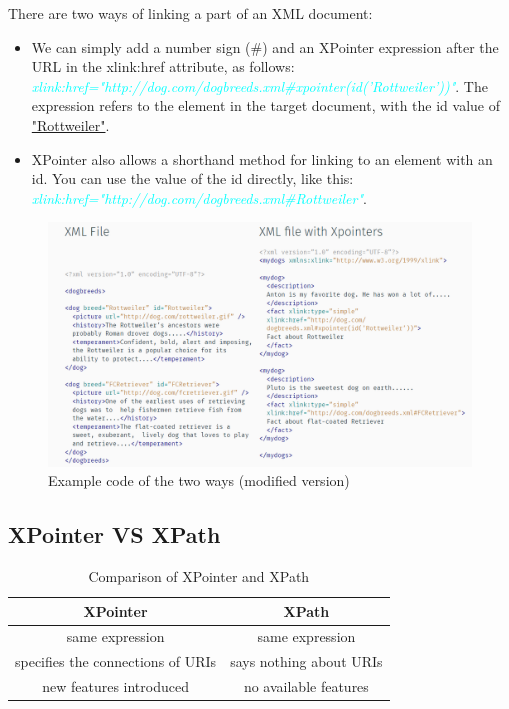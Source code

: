 \documentclass[11pt]{article}
\begin{document}
There are two ways of linking a part of an XML document:
\begin{itemize}
\item We can simply add a number sign (\#) and an XPointer expression after the URL in the xlink:href attribute, as follows:
\textcolor{cyan}{\textit{xlink:href="http://dog.com/dogbreeds.xml\#xpointer(id('Rottweiler'))"}}. The expression refers to the element in the target document, with the id value of \underline{"Rottweiler"}.
\item XPointer also allows a shorthand method for linking to an element with an id. You can use the value of the id directly, like this: \textcolor{cyan}{\textit{xlink:href="http://dog.com/dogbreeds.xml\#Rottweiler"}}.
\end{itemize}
\begin{figure}[!htb]
\centering
  \includegraphics[width=.9\linewidth]{images/xpointerExample}
  \caption{Example code of the two ways (modified version) \cite{W3CSchools}}
  \label{fig:xpointerExample}
\end{figure}
\FloatBarrier

\subsection{XPointer VS XPath}

\begin{table}[!htb]
\centering
 \begin{tabular}{||c || c||} 
 \hline
 \textbf{XPointer} & \textbf{XPath}\\ [0.5ex] 
 \hline
 same expression & same expression\\ 
 \hline
 specifies the connections of URIs & says nothing about URIs \\
 \hline
 new features introduced & no available features \\
 \hline
\end{tabular}
\caption{Comparison of XPointer and XPath}
\label{table:xpointerVSxpath}
\end{table}
\FloatBarrier
\end{document}
